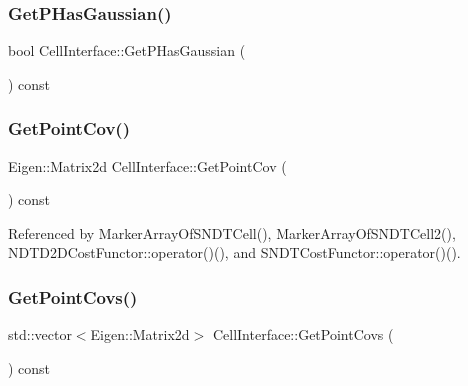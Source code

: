 \subsubsection{\texorpdfstring{Get\+P\+Has\+Gaussian()}{GetPHasGaussian()}}
{\footnotesize\ttfamily bool Cell\+Interface\+::\+Get\+P\+Has\+Gaussian (\begin{DoxyParamCaption}{ }\end{DoxyParamCaption}) const\hspace{0.3cm}{\ttfamily [inline]}}

\mbox{\label{classCellInterface_a774cd7acb975d19866616540357c8974}} 
\subsubsection{\texorpdfstring{Get\+Point\+Cov()}{GetPointCov()}}
{\footnotesize\ttfamily Eigen\+::\+Matrix2d Cell\+Interface\+::\+Get\+Point\+Cov (\begin{DoxyParamCaption}{ }\end{DoxyParamCaption}) const\hspace{0.3cm}{\ttfamily [inline]}}



Referenced by Marker\+Array\+Of\+S\+N\+D\+T\+Cell(), Marker\+Array\+Of\+S\+N\+D\+T\+Cell2(), N\+D\+T\+D2\+D\+Cost\+Functor\+::operator()(), and S\+N\+D\+T\+Cost\+Functor\+::operator()().

\mbox{\label{classCellInterface_a8f2a59b5ee0c5e9971751e9475b8946e}} 
\subsubsection{\texorpdfstring{Get\+Point\+Covs()}{GetPointCovs()}}
{\footnotesize\ttfamily std\+::vector$<$Eigen\+::\+Matrix2d$>$ Cell\+Interface\+::\+Get\+Point\+Covs (\begin{DoxyParamCaption}{ }\end{DoxyParamCaption}) const\hspace{0.3cm}{\ttfamily [inline]}}

\mbox{\label{classCellInterface_a901b89d5b89a4029d41b97ce2ac380a8}} 

